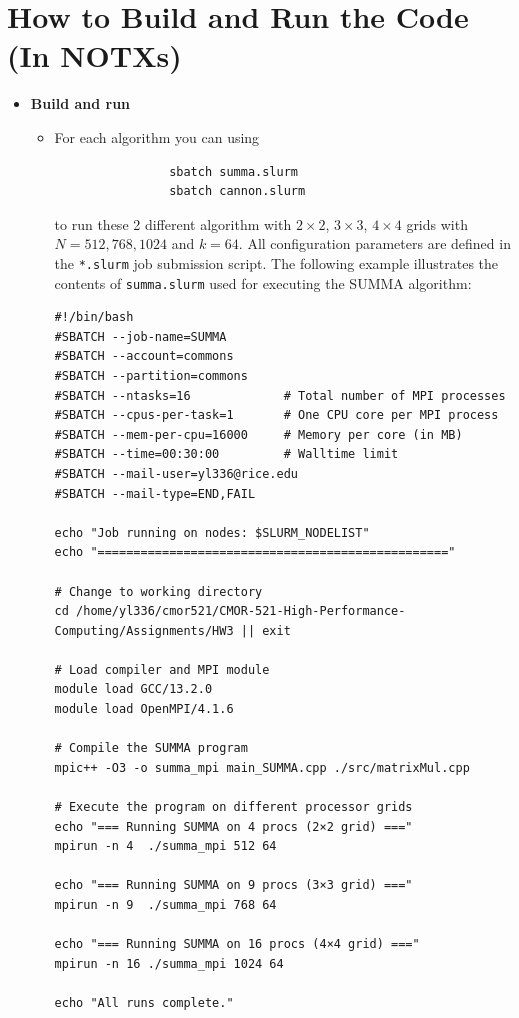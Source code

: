 \documentclass[11pt]{article}
\begin{document}
\newpage

\section{How to Build and Run the Code (In NOTXs)}
\begin{itemize}
    \item \textbf{Build and run}
        \begin{itemize}
            \item For each algorithm you can using
            \begin{verbatim}
                sbatch summa.slurm
                sbatch cannon.slurm
            \end{verbatim}
            to run these 2 different algorithm with $2 \times 2$, $3 \times 3$, $4 \times 4$ grids with $N = 512, 768, 1024$ and $k = 64$. All configuration parameters are defined in the \verb|*.slurm| job submission script. The following example illustrates the contents of \verb|summa.slurm| used for executing the SUMMA algorithm:

\begin{verbatim}
#!/bin/bash
#SBATCH --job-name=SUMMA
#SBATCH --account=commons
#SBATCH --partition=commons
#SBATCH --ntasks=16             # Total number of MPI processes
#SBATCH --cpus-per-task=1       # One CPU core per MPI process
#SBATCH --mem-per-cpu=16000     # Memory per core (in MB)
#SBATCH --time=00:30:00         # Walltime limit
#SBATCH --mail-user=yl336@rice.edu
#SBATCH --mail-type=END,FAIL

echo "Job running on nodes: $SLURM_NODELIST"
echo "================================================="

# Change to working directory
cd /home/yl336/cmor521/CMOR-521-High-Performance-Computing/Assignments/HW3 || exit

# Load compiler and MPI module
module load GCC/13.2.0
module load OpenMPI/4.1.6

# Compile the SUMMA program
mpic++ -O3 -o summa_mpi main_SUMMA.cpp ./src/matrixMul.cpp

# Execute the program on different processor grids
echo "=== Running SUMMA on 4 procs (2×2 grid) ==="
mpirun -n 4  ./summa_mpi 512 64

echo "=== Running SUMMA on 9 procs (3×3 grid) ==="
mpirun -n 9  ./summa_mpi 768 64

echo "=== Running SUMMA on 16 procs (4×4 grid) ==="
mpirun -n 16 ./summa_mpi 1024 64

echo "All runs complete."
\end{verbatim}


\end{itemize}
\end{itemize}
\end{document}
